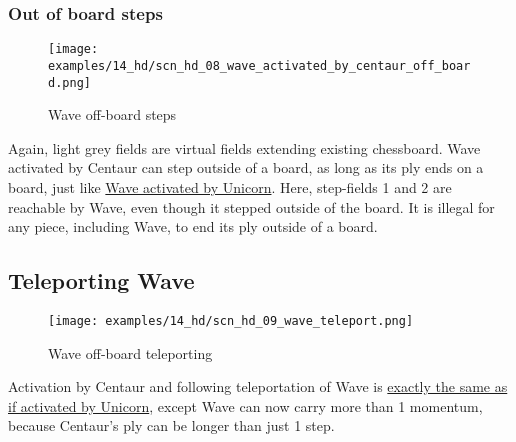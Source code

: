 \clearpage %

\subsubsection*{Out of board steps}

\vspace*{-1.2\baselineskip}
\noindent
\begin{figure}[!h]
\texttt{[image: examples/14\_hd/scn\_hd\_08\_wave\_activated\_by\_centaur\_off\_board.png]}
\caption{Wave off-board steps}
\label{fig:scn_hd_08_wave_activated_by_centaur_off_board}
\end{figure}

Again, light grey fields are virtual fields extending existing chessboard.
Wave activated by Centaur can step outside of a board, as long as its ply
ends on a board, just like
\hyperref[fig:scn_mv_26_wave_off_board]{Wave activated by Unicorn}. Here,
step-fields 1 and 2 are reachable by Wave, even though it stepped outside
of the board. It is illegal for any piece, including Wave, to end its ply
outside of a board.

\clearpage %

\subsection*{Teleporting Wave}

\vspace*{-1.2\baselineskip}
\noindent
\begin{figure}[!h]
\texttt{[image: examples/14\_hd/scn\_hd\_09\_wave\_teleport.png]}
\caption{Wave off-board teleporting}
\label{fig:scn_hd_09_wave_teleport}
\end{figure}

Activation by Centaur and following teleportation of Wave is
\hyperref[fig:scn_n_07_teleport_wave_init]{exactly the same as if activated by Unicorn},
except Wave can now carry more than 1 momentum, because Centaur's ply can be
longer than just 1 step.

\clearpage %

